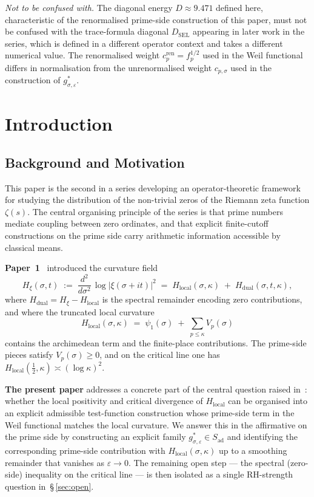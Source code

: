 \documentclass[11pt]{article}
\newcommand{\Hlocal}{H_{\mathrm{local}}}
\newcommand{\Sad}{S_{\mathrm{ad}}}
\newcommand{\cren}{c_p^{\mathrm{ren}}}
\begin{document}
\medskip
\emph{Not to be confused with.}
The diagonal energy $D\approx 9.471$ defined here, characteristic
of the renormalised prime-side construction of this paper, must
not be confused with the trace-formula diagonal $D_{\mathrm{SEL}}$
appearing in later work in the series, which is defined in a
different operator context and takes a different numerical value.
The renormalised weight $\cren=f_p^{1/2}$ used in the Weil
functional differs in normalisation from the unrenormalised
weight $c_{p,\sigma}$ used in the construction of
$g^*_{\sigma,\varepsilon}$.

\newpage

\section{Introduction}
\label{sec:intro}

\subsection{Background and Motivation}

This paper is the second in a series developing an
operator-theoretic framework for studying the distribution of
the non-trivial zeros of the Riemann zeta function $\zeta(s)$.
The central organising principle of the series is that prime
numbers mediate coupling between zero ordinates, and that
explicit finite-cutoff constructions on the prime side carry
arithmetic information accessible by classical means.

\textbf{Paper~1}~\cite{Paper1} introduced the curvature field
\[
H_\xi(\sigma,t) \;:=\; \frac{d^2}{d\sigma^2}\,
\log|\xi(\sigma+it)|^2
\;=\; \Hlocal(\sigma,\kappa) \;+\; H_{\mathrm{dual}}(\sigma,t,\kappa),
\]
where $H_{\mathrm{dual}}=H_\xi-\Hlocal$ is the spectral
remainder encoding zero contributions, and where the truncated
local curvature
\[
\Hlocal(\sigma,\kappa) \;=\; \psi_1(\sigma)
\;+\; \sum_{p\le\kappa} V_p(\sigma)
\]
contains the archimedean term and the finite-place
contributions.
The prime-side pieces satisfy $V_p(\sigma)\ge 0$, and on the
critical line one has $\Hlocal(\tfrac12,\kappa)\asymp
(\log\kappa)^2$.

\textbf{The present paper} addresses a concrete part of the
central question raised in~\cite[\S\,7]{Paper1}: whether the
local positivity and critical divergence of $\Hlocal$ can be
organised into an explicit admissible test-function construction
whose prime-side term in the Weil functional matches the local
curvature.
We answer this in the affirmative on the prime side by
constructing an explicit family $g^*_{\sigma,\varepsilon}\in\Sad$
and identifying the corresponding prime-side contribution with
$\Hlocal(\sigma,\kappa)$ up to a smoothing remainder that
vanishes as $\varepsilon\to 0$.
The remaining open step --- the spectral (zero-side) inequality
on the critical line --- is then isolated as a single
RH-strength question in~\S\,\ref{sec:open}.
\end{document}
